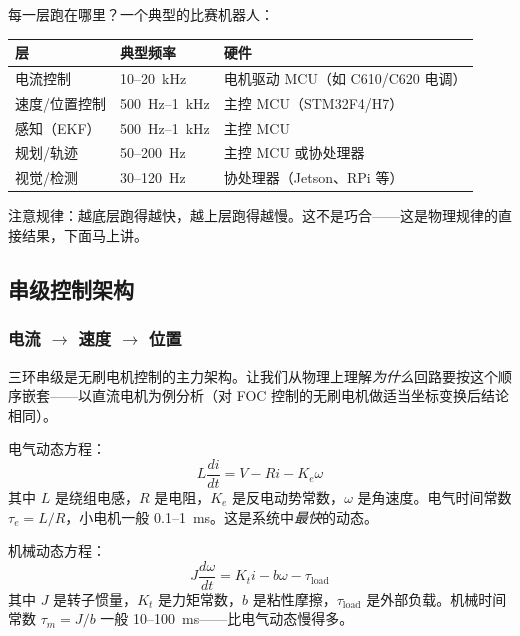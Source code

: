 每一层跑在哪里？一个典型的比赛机器人：

\begin{center}
\begin{tabular}{l l l}
\hline
\textbf{层} & \textbf{典型频率} & \textbf{硬件} \\
\hline
电流控制 & 10--20~kHz & 电机驱动 MCU（如 C610/C620 电调） \\
速度/位置控制 & 500~Hz--1~kHz & 主控 MCU（STM32F4/H7） \\
感知（EKF） & 500~Hz--1~kHz & 主控 MCU \\
规划/轨迹 & 50--200~Hz & 主控 MCU 或协处理器 \\
视觉/检测 & 30--120~Hz & 协处理器（Jetson、RPi 等） \\
\hline
\end{tabular}
\end{center}

注意规律：越底层跑得越快，越上层跑得越慢。这不是巧合——这是物理规律的直接结果，下面马上讲。

\subsection{串级控制架构}

\subsubsection{电流 $\to$ 速度 $\to$ 位置}

三环串级是无刷电机控制的主力架构。让我们从物理上理解\textit{为什么}回路要按这个顺序嵌套——以直流电机为例分析（对 FOC 控制的无刷电机做适当坐标变换后结论相同）。

电气动态方程：
\begin{equation}
L \frac{di}{dt} = V - Ri - K_e \omega
\end{equation}
其中 $L$ 是绕组电感，$R$ 是电阻，$K_e$ 是反电动势常数，$\omega$ 是角速度。电气时间常数 $\tau_e = L/R$，小电机一般 0.1--1~ms。这是系统中\textit{最快}的动态。

机械动态方程：
\begin{equation}
J \frac{d\omega}{dt} = K_t i - b\omega - \tau_{\text{load}}
\end{equation}
其中 $J$ 是转子惯量，$K_t$ 是力矩常数，$b$ 是粘性摩擦，$\tau_{\text{load}}$ 是外部负载。机械时间常数 $\tau_m = J/b$ 一般 10--100~ms——比电气动态慢得多。

